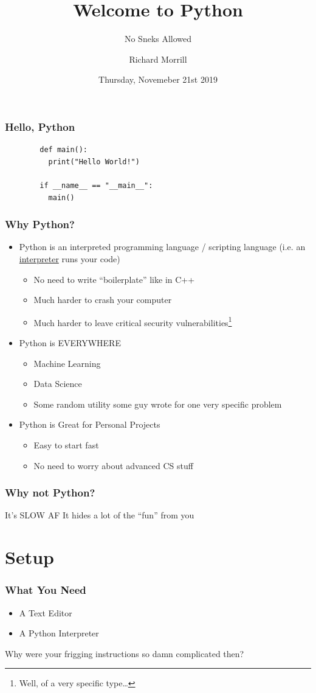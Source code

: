 \documentclass{beamer}
\title{Welcome to Python}
\subtitle{No Sneks Allowed}
\author{Richard Morrill}
\institute{Fordham University CS Society}
\date{Thursday, Novemeber 21st 2019}
\begin{document}
\begin{frame}
	\titlepage
		    
\end{frame}
\begin{frame}[fragile]
	\frametitle{Hello, Python}
	\begin{verbatim}
		def main():
		  print("Hello World!")
				        
		if __name__ == "__main__":
		  main()
	\end{verbatim}
\end{frame}
\begin{frame}
  \frametitle{Why Python?}
  \begin{itemize}
    \item Python is an interpreted programming language / scripting language (i.e. an \underline{interpreter} runs your code)
    \pause
    \begin{itemize}
      \item No need to write ``boilerplate'' like in C++
      \item Much harder to crash your computer
      \item Much harder to leave critical security vulnerabilities\footnote{Well, of a very specific type\dots}
    \end{itemize}
    \pause
    \item Python is EVERYWHERE
    \pause
    \begin{itemize}
      \item Machine Learning
      \item Data Science
      \item Some random utility some guy wrote for one very specific problem
    \end{itemize}
    \item Python is Great for Personal Projects
    \begin{itemize}
      \item Easy to start fast
      \item No need to worry about advanced CS stuff
    \end{itemize}
  \end{itemize}
\end{frame}
\begin{frame}
  \frametitle{Why not Python?}
  \pause
  It's SLOW AF
  \pause
  It hides a lot of the ``fun'' from you
\end{frame}
\section{Setup}
\begin{frame}
  \frametitle{What You Need}
  \begin{itemize}
    \item A Text Editor
    \item A Python Interpreter
  \end{itemize}
  \pause
  Why were your frigging instructions so damn complicated then?
\end{frame}
\end{document}
